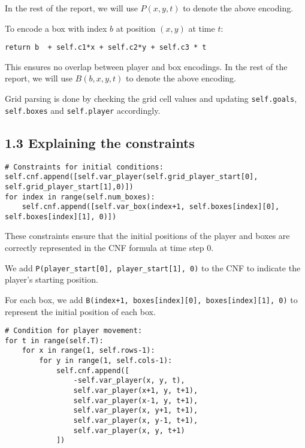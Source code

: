 \documentclass[12pt,a4paper]{article}
\begin{document}
In the rest of the report, we will use \(P(x,y,t)\) to denote the above encoding.

To encode a box with index \(b\) at position \((x,y)\) at time \(t\):

\begin{lstlisting}
return b  + self.c1*x + self.c2*y + self.c3 * t
\end{lstlisting}

This ensures no overlap between player and box encodings. In the rest of the report, we will use \(B(b,x,y,t)\) to denote the above encoding.

Grid parsing is done by checking the grid cell values and updating \texttt{self.goals}, \texttt{self.boxes} and \texttt{self.player} accordingly.
\newpage

\newpage

\subsection*{1.3 Explaining the constraints}

\begin{lstlisting}
# Constraints for initial conditions:
self.cnf.append([self.var_player(self.grid_player_start[0], self.grid_player_start[1],0)])
for index in range(self.num_boxes):
    self.cnf.append([self.var_box(index+1, self.boxes[index][0], self.boxes[index][1], 0)])
\end{lstlisting}

These constraints ensure that the initial positions of the player and boxes are correctly represented in the CNF formula at time step 0.  

We add \texttt{P(player\_start[0], player\_start[1], 0)} to the CNF to indicate the player's starting position.  

For each box, we add \texttt{B(index+1, boxes[index][0], boxes[index][1], 0)} to represent the initial position of each box.



\begin{lstlisting}
# Condition for player movement:
for t in range(self.T):
    for x in range(1, self.rows-1):
        for y in range(1, self.cols-1):
            self.cnf.append([
                -self.var_player(x, y, t),
                self.var_player(x+1, y, t+1),
                self.var_player(x-1, y, t+1),
                self.var_player(x, y+1, t+1),
                self.var_player(x, y-1, t+1),
                self.var_player(x, y, t+1)
            ])
\end{lstlisting}
\end{document}
